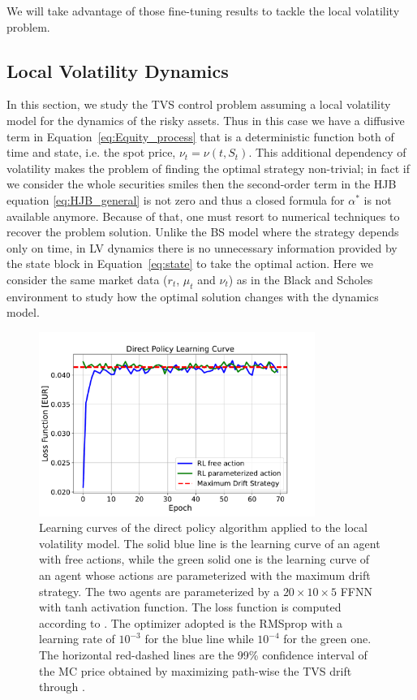 \documentclass[11pt]{article}
\begin{document}
We will take advantage of those fine-tuning results to tackle the local volatility problem.

\subsection{Local Volatility Dynamics}
In this section, we study the TVS control problem assuming a local volatility model for the dynamics of the risky assets. Thus in this case we have a diffusive term in Equation~\eqref{eq:Equity_process} that is a deterministic function both of time and state, i.e. the spot price, $\nu_t=\nu(t,S_t)$. This additional dependency of volatility makes the problem of finding the optimal strategy non-trivial; in fact if we consider the whole securities smiles then the second-order term in the HJB equation \eqref{eq:HJB_general} is not zero and thus a closed formula for $\alpha^*$ is not available anymore. Because of that, one must resort to numerical techniques to recover the problem solution. Unlike the BS model where the strategy depends only on time, in LV dynamics there is no unnecessary information provided by the state block in Equation~\eqref{eq:state} to take the optimal action. Here we consider the same market data ($r_t$, $\mu_t$ and $\nu_t$) as in the Black and Scholes environment to study how the optimal solution changes with the dynamics model. 
\begin{figure}[h!]
	\centering
	\includegraphics[width=9cm,height=6cm]{LV_direct_policy_approach.pdf}
	\caption{Learning curves of the direct policy algorithm applied to the local volatility model. The solid blue line is the learning curve of an agent with free actions, while the green solid one is the learning curve of an agent whose actions are parameterized with the maximum drift strategy. The two agents are parameterized by a $20 \times 10 \times 5$ FFNN with tanh activation function. The loss function is computed according to . The optimizer adopted is the RMSprop with a learning rate of $10^{-3}$ for the blue line while $10^{-4}$ for the green one. The horizontal red-dashed lines are the 99\% confidence interval of the MC price obtained by maximizing path-wise the TVS drift through .}
	\label{fig:result_lv_direct_policy}
\end{figure}  
\end{document}
